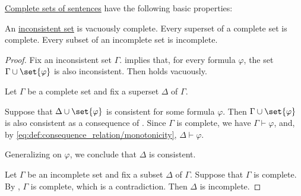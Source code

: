 \begin{proposition}\label{thm:def:complete_set_of_sentences}
  \hyperref[def:complete_set_of_sentences]{Complete sets of sentences} have the following basic properties:
  \begin{thmenum}
     An \hyperref[def:consistent_set_of_sentences]{inconsistent set} is vacuously complete.
     Every superset of a complete set is complete.
     Every subset of an incomplete set is incomplete.
  \end{thmenum}
\end{proposition}
\begin{proof}
   Fix an inconsistent set \( \Gamma \).  implies that, for every formula \( \varphi \), the set \( \Gamma \cup \set{ \varphi } \) is also inconsistent. Then  holds vacuously.

   Let \( \Gamma \) be a complete set and fix a superset \( \Delta \) of \( \Gamma \).

  Suppose that \( \Delta \cup \set{ \varphi } \) is consistent for some formula \( \varphi \). Then \( \Gamma \cup \set{ \varphi } \) is also consistent as a consequence of . Since \( \Gamma \) is complete, we have \( \Gamma \vdash \varphi \), and, by \eqref{eq:def:consequence_relation/monotonicity}, \( \Delta \vdash \varphi \).

  Generalizing on \( \varphi \), we conclude that \( \Delta \) is consistent.

   Let \( \Gamma \) be an incomplete set and fix a subset \( \Delta \) of \( \Gamma \). Suppose that \( \Gamma \) is complete. By , \( \Gamma \) is complete, which is a contradiction. Then \( \Delta \) is incomplete.
\end{proof}

